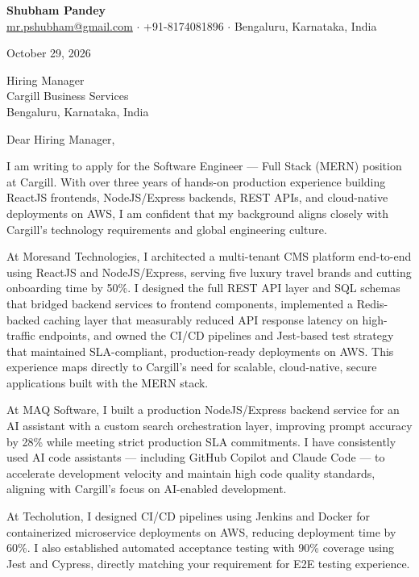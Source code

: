 \documentclass[a4paper,11pt]{article}
\begin{document}
\begin{center}
  {\LARGE \textbf{Shubham Pandey}}\\[4pt]
  \href{mailto:mr.pshubham@gmail.com}{mr.pshubham@gmail.com} $\cdot$ +91-8174081896 $\cdot$ Bengaluru, Karnataka, India
\end{center}

\vspace{12pt}
October 29, 2026

\vspace{12pt}
Hiring Manager\\
Cargill Business Services\\
Bengaluru, Karnataka, India

\vspace{12pt}
Dear Hiring Manager,

\vspace{8pt}
I am writing to apply for the Software Engineer --- Full Stack (MERN) position at Cargill. With over three years of hands-on production experience building ReactJS frontends, NodeJS/Express backends, REST APIs, and cloud-native deployments on AWS, I am confident that my background aligns closely with Cargill's technology requirements and global engineering culture.

\vspace{8pt}
At Moresand Technologies, I architected a multi-tenant CMS platform end-to-end using ReactJS and NodeJS/Express, serving five luxury travel brands and cutting onboarding time by 50\%. I designed the full REST API layer and SQL schemas that bridged backend services to frontend components, implemented a Redis-backed caching layer that measurably reduced API response latency on high-traffic endpoints, and owned the CI/CD pipelines and Jest-based test strategy that maintained SLA-compliant, production-ready deployments on AWS. This experience maps directly to Cargill's need for scalable, cloud-native, secure applications built with the MERN stack.

\vspace{8pt}
At MAQ Software, I built a production NodeJS/Express backend service for an AI assistant with a custom search orchestration layer, improving prompt accuracy by 28\% while meeting strict production SLA commitments. I have consistently used AI code assistants --- including GitHub Copilot and Claude Code --- to accelerate development velocity and maintain high code quality standards, aligning with Cargill's focus on AI-enabled development.

\vspace{8pt}
At Techolution, I designed CI/CD pipelines using Jenkins and Docker for containerized microservice deployments on AWS, reducing deployment time by 60\%. I also established automated acceptance testing with 90\% coverage using Jest and Cypress, directly matching your requirement for E2E testing experience.
\end{document}
